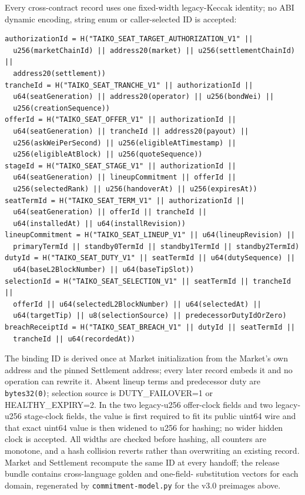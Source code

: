 \documentclass[a4paper,11pt]{article}
\newcommand{\code}[1]{\nolinkurl{#1}}
\begin{document}
Every cross-contract record uses one fixed-width legacy-Keccak identity; no ABI
dynamic encoding, string enum or caller-selected ID is accepted:
\begin{verbatim}
authorizationId = H("TAIKO_SEAT_TARGET_AUTHORIZATION_V1" ||
  u256(marketChainId) || address20(market) || u256(settlementChainId) ||
  address20(settlement))
trancheId = H("TAIKO_SEAT_TRANCHE_V1" || authorizationId ||
  u64(seatGeneration) || address20(operator) || u256(bondWei) ||
  u256(creationSequence))
offerId = H("TAIKO_SEAT_OFFER_V1" || authorizationId ||
  u64(seatGeneration) || trancheId || address20(payout) ||
  u256(askWeiPerSecond) || u256(eligibleAtTimestamp) ||
  u256(eligibleAtBlock) || u256(quoteSequence))
stageId = H("TAIKO_SEAT_STAGE_V1" || authorizationId ||
  u64(seatGeneration) || lineupCommitment || offerId ||
  u256(selectedRank) || u256(handoverAt) || u256(expiresAt))
seatTermId = H("TAIKO_SEAT_TERM_V1" || authorizationId ||
  u64(seatGeneration) || offerId || trancheId ||
  u64(installedAt) || u64(installRevision))
lineupCommitment = H("TAIKO_SEAT_LINEUP_V1" || u64(lineupRevision) ||
  primaryTermId || standby0TermId || standby1TermId || standby2TermId)
dutyId = H("TAIKO_SEAT_DUTY_V1" || seatTermId || u64(dutySequence) ||
  u64(baseL2BlockNumber) || u64(baseTipSlot))
selectionId = H("TAIKO_SEAT_SELECTION_V1" || seatTermId || trancheId ||
  offerId || u64(selectedL2BlockNumber) || u64(selectedAt) ||
  u64(targetTip) || u8(selectionSource) || predecessorDutyIdOrZero)
breachReceiptId = H("TAIKO_SEAT_BREACH_V1" || dutyId || seatTermId ||
  trancheId || u64(recordedAt))
\end{verbatim}
The binding ID is derived once at Market initialization from the Market's own
address and the pinned Settlement address; every later record embeds it and no
operation can rewrite it.  Absent lineup terms and predecessor duty are
\code{bytes32(0)}; selection source is DUTY\_FAILOVER=1 or HEALTHY\_EXPIRY=2.  In the two legacy-u256 offer-clock
fields and two legacy-u256 stage-clock fields, the value is first required to
fit its public uint64 wire and that exact uint64 value is then widened to u256
for hashing; no wider hidden clock is accepted.  All widths are checked before hashing,
all counters are monotone, and a hash collision reverts rather than overwriting
an existing record.  Market and Settlement recompute the same ID at every
handoff; the release bundle contains cross-language golden and one-field-
substitution vectors for each domain, regenerated by
\code{commitment-model.py} for the v3.0 preimages above.
\end{document}
